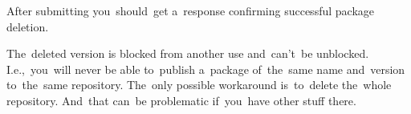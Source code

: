 \noindent After submitting you~should~get a~response confirming successful package deletion.

\warning The~deleted version is blocked from another use and~can't~be unblocked.
I.e.,~you~will never be able to~publish a~package of~the~same name and~version to~the~same repository.
The~only possible workaround is~to~delete the~whole repository.
And~that can~be problematic if~you~have other stuff there.

